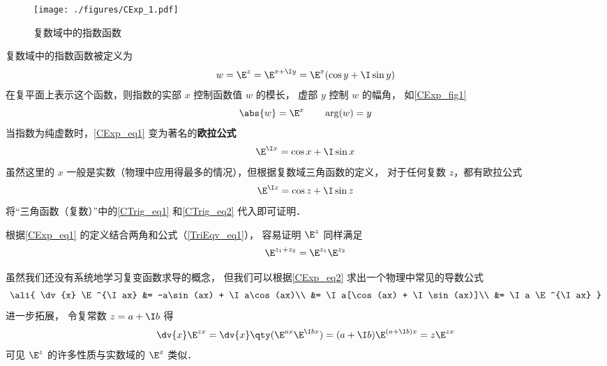 


\begin{figure}[ht]
\centering
\texttt{[image: ./figures/CExp\_1.pdf]}
\caption{复数域中的指数函数} \label{CExp_fig1}
\end{figure}

复数域中的指数函数被定义为
 \begin{equation}\label{CExp_eq1}
w = \E^z = \E^{x + \I y} = \E^x(\cos y + \I\sin y)
\end{equation}
在复平面上表示这个函数，则指数的实部 $x$ 控制函数值 $w$ 的模长， 虚部 $y$ 控制 $w$ 的幅角， 如\autoref{CExp_fig1}
 \begin{equation}
\abs{w} = \E^x \qquad \arg(w) = y
\end{equation}
当指数为纯虚数时，\autoref{CExp_eq1} 变为著名的\textbf{欧拉公式}
\begin{equation}\label{CExp_eq2}
\E^{\I x} = \cos x + \I\sin x
\end{equation}
虽然这里的 $x$ 一般是实数（物理中应用得最多的情况），但根据复数域三角函数的定义， 对于任何复数 $z$，都有欧拉公式
\begin{equation}
\E^{\I z} = \cos z + \I\sin z
\end{equation}
将“三角函数（复数）”中的\autoref{CTrig_eq1} 和\autoref{CTrig_eq2} 代入即可证明．

根据\autoref{CExp_eq1} 的定义结合两角和公式（\autoref{TriEqv_eq1}）， 容易证明 $\E^z$ 同样满足
\begin{equation}
\E^{z_1 + z_2} = \E^{z_1}\E^{z_2}
\end{equation}

虽然我们还没有系统地学习复变函数求导的概念， 但我们可以根据\autoref{CExp_eq2} 求出一个物理中常见的导数公式
\begin{equation}\ali{
\dv{x} \E^{\I ax} &= -a\sin(ax) + \I a\cos(ax)\\
&= \I a[\cos(ax) + \I \sin(ax)]\\
&= \I a \E^{\I ax}
}\end{equation}
进一步拓展， 令复常数 $z = a + \I b$ 得
\begin{equation}
\dv{x}\E^{z x} = \dv{x} \qty(\E^{ax}\E^{\I bx}) = (a + \I b)\E^{(a+\I b)x} = z\E^{zx}
\end{equation}
可见 $\E^z$ 的许多性质与实数域的 $\E^x$ 类似．


